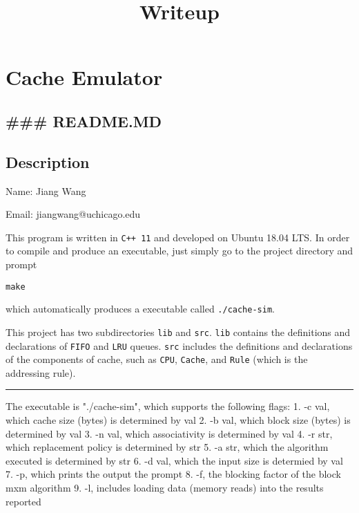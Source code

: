 \documentclass[11pt]{article}
\title{Writeup}
\begin{document}
    
    
    \maketitle
    
    

    
    \section{Cache Emulator}\label{cache-emulator}

\subsection{\#\#\# README.MD}\label{readme.md}

\subsection{Description}\label{description}

Name: Jiang Wang

Email: jiangwang@uchicago.edu

This program is written in \texttt{C++\ 11} and developed on Ubuntu
18.04 LTS. In order to compile and produce an executable, just simply go
to the project directory and prompt

\begin{verbatim}
make
\end{verbatim}

which automatically produces a executable called \texttt{./cache-sim}.

This project has two subdirectories \texttt{lib} and \texttt{src}.
\texttt{lib} contains the definitions and declarations of \texttt{FIFO}
and \texttt{LRU} queues. \texttt{src} includes the definitions and
declarations of the components of cache, such as \texttt{CPU},
\texttt{Cache}, and \texttt{Rule} (which is the addressing rule).

\begin{center}\rule{0.5\linewidth}{\linethickness}\end{center}

The executable is "./cache-sim", which supports the following flags: 1.
-c val, which cache size (bytes) is determined by val 2. -b val, which
block size (bytes) is determined by val 3. -n val, which associativity
is determined by val 4. -r str, which replacement policy is determined
by str 5. -a str, which the algorithm executed is determined by str 6.
-d val, which the input size is determied by val 7. -p, which prints the
output the prompt 8. -f, the blocking factor of the block mxm algorithm
9. -l, includes loading data (memory reads) into the results reported
\end{document}
